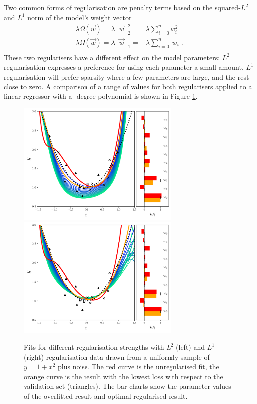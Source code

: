 Two common forms of regularisation are penalty terms based on the squared-$L^{2}$ and $L^{1}$ norm of the model's weight vector
\begin{equation}
    \begin{split}
        \lambda\Omega(\vec{w}) = \lambda||\vec{w}||^{2}_{2} =& \lambda\sum_{i=0}^{n}w_{i}^{2} \\
        \lambda\Omega(\vec{w}) = \lambda||\vec{w}||_{1} =& \lambda\sum_{i=0}^{n}|w_{i}|. \\
    \end{split}
\end{equation}
These two regularisers have a different effect on the model parameters: $L^{2}$ regularisation expresses a preference for using each parameter a small amount, $L^{1}$ regularisation will prefer sparsity where a few parameters are large, and the rest close to zero. 
A comparison of a range of values for both regularisers applied to a linear regressor with a -degree polynomial is shown in Figure \ref{fig:machine_learning:reg_example}. 
\begin{figure}[h!]
    \begin{center}
        \includegraphics[width=0.7\textwidth]{figures/machine_learning/L2_reg_plot.pdf}
        \includegraphics[width=0.7\textwidth]{figures/machine_learning/L1_reg_plot.pdf}
    \end{center}
    \caption{Fits for different regularisation strengths with $L^{2}$ (left) and $L^{1}$ (right) regularisation data drawn from a uniformly sample of $y=1+x^{2}$ plus noise. The red curve is the unregularised fit, the orange curve is the result with the lowest loss with respect to the validation set (triangles). The bar charts show the parameter values of the overfitted result and optimal regularised result.} 
        \label{fig:machine_learning:reg_example}
\end{figure}

